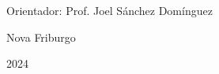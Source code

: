 \begin{titlepage}
    \vspace{1.5cm}

    \begin{flushleft}
        \begin{minipage}{0.5\textwidth}
            \large
            \raggedright
            Orientador: Prof. Joel Sánchez Domínguez
        \end{minipage}
    \end{flushleft}


    \vfill %

    {\large Nova Friburgo \par}
    \vspace{0.3cm}
    {\large 2024 \par}
\end{titlepage}
\newpage %
